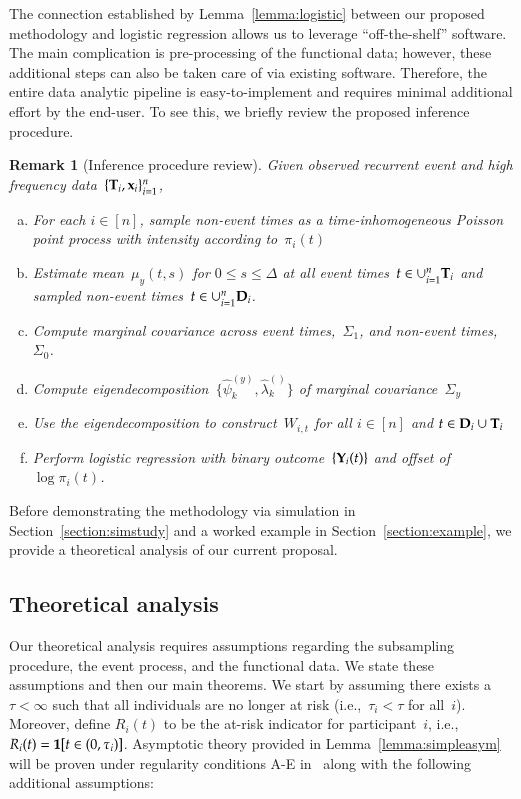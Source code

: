 \documentclass[12pt]{amsart}
\newtheorem{rmk}[thm]{Remark}%
\def\Y{{\bf Y}}
\def\bfx{{\bf x}}
\def\bfT{{\bf T}}
\def\bfD{{\bf D}}
\begin{document}
The connection established by Lemma~\ref{lemma:logistic} between our proposed methodology and logistic regression allows us to leverage ``off-the-shelf'' software.  The main complication is pre-processing of the functional data; however, these additional steps can also be taken care of via existing software.  Therefore, the entire data analytic pipeline is easy-to-implement and requires minimal additional effort by the end-user. To see this, we briefly review the proposed inference procedure.

\begin{rmk}[Inference procedure review] \normalfont
Given observed recurrent event and high frequency data~$\{ \bfT_i, \bfx_i \}_{i=1}^n$,
\begin{enumerate}[(a)]
\item For each $i \in [n]$, sample non-event times as a time-inhomogeneous Poisson point process with intensity according to~$\pi_i (t)$
\item \label{p2} Estimate mean~$\mu_y (t,s)$ for $0 \leq s \leq \Delta$ at all event times~$t \in \cup_{i=1}^n \bfT_i$ and sampled non-event times~$t \in \cup_{i=1}^n \bfD_i$.
\item \label{p3} Compute marginal covariance across event times,~$\Sigma_1$, and non-event times,~$\Sigma_0$.
\item \label{p4} Compute eigendecomposition~$\{ \hat \psi_k^{(y)}, \hat \lambda_k^{()} \}$ of marginal covariance~$\Sigma_y$
\item Use the eigendecomposition to construct~$W_{i,t}$ for all $i \in [n]$ and $t \in \bfD_i \cup \bfT_i$
\item \label{point:log} Perform logistic regression with binary outcome~$\{ \Y_i (t) \}$  and offset of~$\log \pi_i (t)$.
\end{enumerate}
\end{rmk}

\noindent Before demonstrating the methodology via simulation in Section~\ref{section:simstudy} and a worked example in Section~\ref{section:example}, we provide a theoretical analysis of our current proposal.


\subsection{Theoretical analysis}
\label{section:theory}

Our theoretical analysis requires assumptions regarding the subsampling procedure, the event process, and the functional data. We state these assumptions and then our main theorems. We start by assuming there exists a~$\tau < \infty$ such that all individuals are no longer at risk (i.e.,~$\tau_i < \tau$ for all~$i$). Moreover, define $R_i (t)$ to be the at-risk indicator for participant~$i$, i.e., $R_i (t) = {\bf 1} [t \in (0,\tau_i)]$. Asymptotic theory provided in Lemma~\ref{lemma:simpleasym} will be proven under regularity conditions A-E in~\cite[pp. 420--421]{Andersen1993} along with the following additional assumptions:
\end{document}
